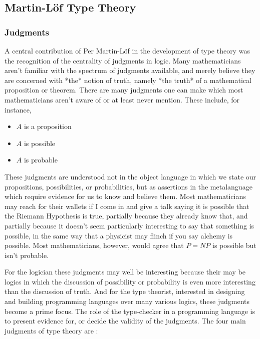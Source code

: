 \subsection{Martin-Löf Type Theory}
\subsubsection{Judgments}

A central contribution of Per Martin-Löf in the development of type theory was
the recognition of the centrality of judgments in logic. Many mathematicians
aren't familiar with the spectrum of judgments available, and merely believe
they are concerned with *the* notion of truth, namely *the truth* of a
mathematical proposition or theorem. There are many judgments one can make which
most mathematicians aren't aware of or at least never mention. These include,
for instance,

\begin{itemize}[noitemsep]

\item $A$ is a proposition
\item $A$ is possible
\item $A$ is probable

\end{itemize}

These judgments are understood not in the object language in which we state our
propositions, possibilities, or probabilities, but as assertions in the
metalanguage which require evidence for us to know and believe them. Most
mathematicians may reach for their wallets if I come in and give a talk saying
it is possible that the Riemann Hypothesis is true, partially because they
already know that, and partially because it doesn't seem particularly
interesting to say that something is possible, in the same way that a physicist
may flinch if you say alchemy is possible. Most mathematicians, however, would
agree that $P = NP$ is possible but isn't probable.

For the logician these judgments may well be interesting because their may be
logics in which the discussion of possibility or probability is even more
interesting than the discussion of truth. And for the type theorist, interested
in designing and building programming languages over many various logics, these
judgments become a prime focus. The role of the type-checker in a programming
language is to present evidence for, or decide the validity of the judgments.
The four main judgments of type theory are :

